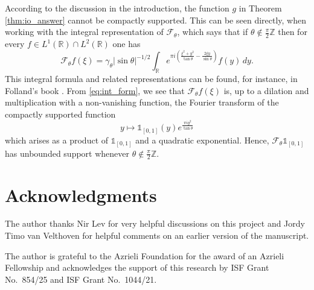 \documentclass[reqno,a4paper,12pt]{amsart}
\numberwithin{equation}{section}
\def\Z{{\mathbb Z}}
\def\R{{\mathbb R}}
\newcommand{\ft}{{\mathcal{F}}}
\newcommand\1{\mathds{1}}
\begin{document}
According to the discussion in the introduction, the function $g$ in Theorem \ref{thm:io_answer} cannot be compactly supported. This can be seen directly, when working with the integral representation of $\ft_\theta$, which says that if $\theta \not \in \frac \pi2 \Z$ then for every $f \in L^1(\R) \cap L^2(\R)$ one has
\begin{equation}\label{eq:int_form}
    \ft_\theta f(\xi) = \gamma_\theta |\sin\theta|^{-1/2} \int_{\mathbb R} e^{\pi i \left(\frac{\xi^2+y^2}{\tan\theta}-\frac{2\xi y}{\sin\theta} \right)} f(y)\,dy.
\end{equation}
This integral formula and related representations can be found, for instance, in Folland's book \cite{folland}.
From \eqref{eq:int_form}, we see that $\ft_\theta f(\xi)$ is, up to a dilation and multiplication with a non-vanishing function, the Fourier transform of the compactly supported function $$y \mapsto \1_{[0,1]}(y) e^{ \frac{\pi i y^2}{\tan \theta} }$$ which arises as a product of $\1_{[0,1]}$ and a quadratic exponential. Hence, $\ft_\theta \1_{[0,1]}$ has unbounded support whenever $\theta \not \in \frac \pi2 \Z$.

\section*{Acknowledgments}

The author thanks Nir Lev for very helpful discussions on this project and Jordy Timo van Velthoven for helpful comments on an earlier version of the manuscript.

\medskip
The author is grateful to the Azrieli Foundation for the award of an Azrieli Fellowship and acknowledges the support of this research by ISF Grant No.~854/25 and ISF Grant No.~1044/21.



\end{document}
